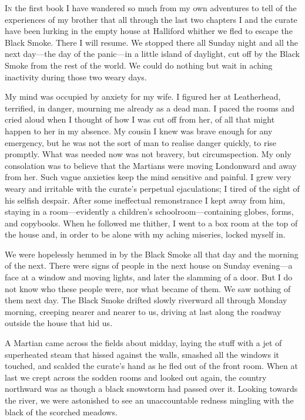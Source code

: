 

\lettrine[lines=4]{I}{n} the first book I have wandered so much from my own adventures to tell of the experiences of my brother that all through the last two chapters I and the curate have been lurking in the empty house at Halliford whither we fled to escape the Black Smoke. There I will resume. We stopped there all Sunday night and all the next day—the day of the panic—in a little island of daylight, cut off by the Black Smoke from the rest of the world. We could do nothing but wait in aching inactivity during those two weary days.

My mind was occupied by anxiety for my wife. I figured her at Leatherhead, terrified, in danger, mourning me already as a dead man. I paced the rooms and cried aloud when I thought of how I was cut off from her, of all that might happen to her in my absence. My cousin I knew was brave enough for any emergency, but he was not the sort of man to realise danger quickly, to rise promptly. What was needed now was not bravery, but circumspection. My only consolation was to believe that the Martians were moving Londonward and away from her. Such vague anxieties keep the mind sensitive and painful. I grew very weary and irritable with the curate's perpetual ejaculations; I tired of the sight of his selfish despair. After some ineffectual remonstrance I kept away from him, staying in a room—evidently a children's schoolroom—containing globes, forms, and copybooks. When he followed me thither, I went to a box room at the top of the house and, in order to be alone with my aching miseries, locked myself in.

We were hopelessly hemmed in by the Black Smoke all that day and the morning of the next. There were signs of people in the next house on Sunday evening—a face at a window and moving lights, and later the slamming of a door. But I do not know who these people were, nor what became of them. We saw nothing of them next day. The Black Smoke drifted slowly riverward all through Monday morning, creeping nearer and nearer to us, driving at last along the roadway outside the house that hid us.

A Martian came across the fields about midday, laying the stuff with a jet of superheated steam that hissed against the walls, smashed all the windows it touched, and scalded the curate's hand as he fled out of the front room. When at last we crept across the sodden rooms and looked out again, the country northward was as though a black snowstorm had passed over it. Looking towards the river, we were astonished to see an unaccountable redness mingling with the black of the scorched meadows.

